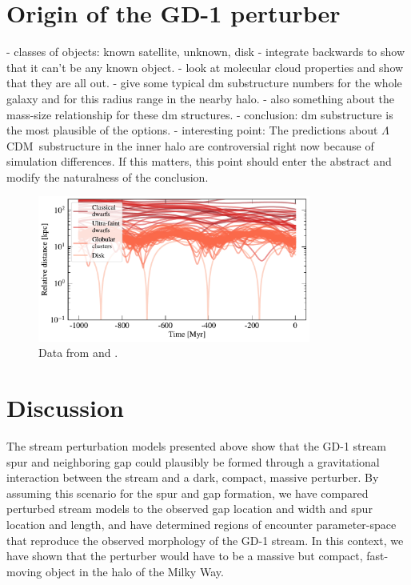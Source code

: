 \documentclass[12pt, modern]{aastex62}
\newcommand{\acronym}[1]{{\small{#1}}}
\newcommand{\lcdm}{\acronym{$\Lambda$CDM}}
\begin{document}
\section{Origin of the GD-1 perturber}
\label{sec:origin}
- classes of objects: known satellite, unknown, disk
- integrate backwards to show that it can't be any known object.
- look at molecular cloud properties and show that they are all out.
- give some typical dm substructure numbers for the whole galaxy and for this radius range in the nearby halo.
- also something about the mass-size relationship for these dm structures.
- conclusion: dm substructure is the most plausible of the options.
- interesting point: The predictions about \lcdm\ substructure in the inner halo are controversial right now because of simulation differences. If this matters, this point should enter the abstract and modify the naturalness of the conclusion.

\begin{figure}
\begin{center}
\includegraphics[width=0.8\textwidth]{satellite_distances.pdf}
\end{center}
\caption{Data from \citet{simon2018} and \citet{gdr2_satellites}.}
\label{fig:known_encounters}
\end{figure}


\section{Discussion}

The stream perturbation models presented above show that the GD-1 stream spur and neighboring gap could plausibly be formed through a gravitational interaction between the stream and a dark, compact, massive perturber.
By assuming this scenario for the spur and gap formation, we have compared perturbed stream models to the observed gap location and width and spur location and length, and have determined regions of encounter parameter-space that reproduce the observed morphology of the GD-1 stream.
In this context, we have shown that the perturber would have to be a massive but compact, fast-moving object in the halo of the Milky Way.
\end{document}
